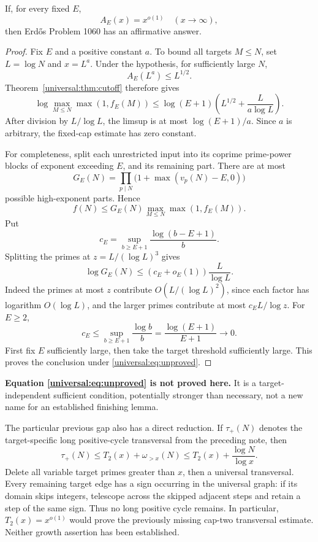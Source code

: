 \begin{corollary}\label{universal:cor:conditional}
If, for every fixed $E$,
\begin{equation}\label{universal:eq:unproved}
 \boxed{A_E(x)=x^{o(1)}\quad(x\to\infty),}
\end{equation}
then Erd\H{o}s Problem 1060 has an affirmative answer.
\end{corollary}
\begin{proof}
Fix $E$ and a positive constant $a$. To bound all targets $M\le N$, set $L=\log N$ and $x=L^a$. Under the hypothesis, for sufficiently large $N$,
\[
 A_E(L^a)\le L^{1/2}.
\]
Theorem~\ref{universal:thm:cutoff} therefore gives
\[
 \log\max_{M\le N}\max(1,f_E(M))
 \le\log(E+1)\left(L^{1/2}+\frac{L}{a\log L}\right).
\]
After division by $L/\log L$, the limsup is at most $\log(E+1)/a$. Since $a$ is arbitrary, the fixed-cap estimate has zero constant.

For completeness, split each unrestricted input into its coprime prime-power blocks of exponent exceeding $E$, and its remaining part. There are at most
\[
 G_E(N)=\prod_{p\mid N}\bigl(1+\max(v_p(N)-E,0)\bigr)
\]
possible high-exponent parts. Hence
\[
 f(N)\le G_E(N)\max_{M\le N}\max(1,f_E(M)).
\]
Put
\[
 c_E=\sup_{b\ge E+1}\frac{\log(b-E+1)}b.
\]
Splitting the primes at $z=L/(\log L)^3$ gives
\[
 \log G_E(N)\le(c_E+o_E(1))\frac{L}{\log L}.
\]
Indeed the primes at most $z$ contribute $O(L/(\log L)^2)$, since each factor has logarithm $O(\log L)$, and the larger primes contribute at most $c_EL/\log z$. For $E\ge2$,
\[
 c_E\le\sup_{b\ge E+1}\frac{\log b}{b}
 =\frac{\log(E+1)}{E+1}\longrightarrow0.
\]
First fix $E$ sufficiently large, then take the target threshold sufficiently large. This proves the conclusion under \eqref{universal:eq:unproved}.
\end{proof}

\textbf{Equation \eqref{universal:eq:unproved} is not proved here.} It is a target-independent sufficient condition, potentially stronger than necessary, not a new name for an established finishing lemma.

The particular previous gap also has a direct reduction. If $\tau_+(N)$ denotes the target-specific long positive-cycle transversal from the preceding note, then
\begin{equation}\label{universal:eq:tau}
 \boxed{\tau_+(N)\le T_2(x)+\omega_{>x}(N)
 \le T_2(x)+\frac{\log N}{\log x}.}
\end{equation}
Delete all variable target primes greater than $x$, then a universal transversal. Every remaining target edge has a sign occurring in the universal graph: if its domain skips integers, telescope across the skipped adjacent steps and retain a step of the same sign. Thus no long positive cycle remains. In particular, $T_2(x)=x^{o(1)}$ would prove the previously missing cap-two transversal estimate. Neither growth assertion has been established.


